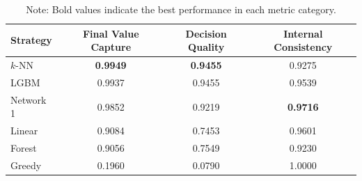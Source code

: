 \documentclass[11pt,reqno,a4paper]{amsart}
\theoremstyle{definition}
\numberwithin{equation}{section}
\DeclareMathOperator{\1}{\mathbbm{1}}
\begin{document}
\begin{table}[htbp]
  \centering
  \caption{Performance Metrics of Different Strategies, CL Experiment}
  \label{tab:strategy_metrics_3}
  \begin{tabular}{lccc}
    \toprule
    \textbf{Strategy} & \textbf{Final Value Capture} & \textbf{Decision Quality} & \textbf{Internal Consistency} \\
    \midrule
    $k$-NN            & \textbf{0.9949}              & \textbf{0.9455}           & 0.9275                        \\
    LGBM              & 0.9937                       & 0.9455                    & 0.9539                        \\
    Network 1         & 0.9852                       & 0.9219                    & \textbf{0.9716}               \\
    Linear            & 0.9084                       & 0.7453                    & 0.9601                        \\
    Forest            & 0.9056                       & 0.7549                    & 0.9230                        \\
    Greedy            & 0.1960                       & 0.0790                    & 1.0000                        \\
    \bottomrule
  \end{tabular}
  \caption*{\small Note: Bold values indicate the best performance in each metric category.}
\end{table}
\end{document}
